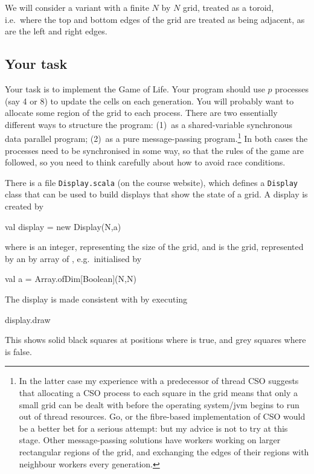\documentclass{../csopractical}
\begin{document}
We will consider a variant with a finite $N$ by $N$ grid, treated as a toroid,
i.e.\ where the top and bottom edges of the grid are treated as being
adjacent, as are the left and right edges.


\subsection*{Your task}

Your task is to implement the Game of Life.  Your program should
use $p$ processes (say 4 or 8) to update the cells on each generation.
You will probably want to allocate some region of the grid to each
process.  There are two essentially different ways to structure the
program: (1)~as a shared-variable synchronous data parallel program;
(2)~as a pure message-passing program.\footnote {In the latter case
my experience with a predecessor of thread CSO suggests that
allocating a CSO process to each square in the grid means that only
a small grid can be dealt with before the operating system/jvm
begins to run out of thread resources. Go, or the fibre-based
implementation of CSO would be a better bet for a serious attempt:
but my advice is not to try at this stage. Other message-passing
solutions have workers working on larger rectangular regions of the grid,
and exchanging the edges of their regions with neighbour workers
every generation.}  In both cases the processes need to be synchronised
in some way, so that the rules of the game are followed, so you need
to think carefully about how to avoid race conditions.

There is a file
\texttt{Display.scala} (on the course website), which defines
a \texttt{Display} class that can be used to build displays
that show the state of a grid.  A
display is created by
%
\begin{scala}
  val display = new Display(N,a)
\end{scala}
%
where  is an integer, representing the size of the grid, and
 is the grid, represented by an  by  array of ,
e.g.\ initialised by
%
\begin{scala}
  val a =  Array.ofDim[Boolean](N,N)
\end{scala}
%
The display is made consistent with  by executing
%
\begin{scala}
  display.draw
\end{scala}
%
This shows solid black squares at positions  where  is true,
and grey squares where  is false.
\end{document}
